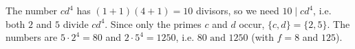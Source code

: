 The number $cd^4$ has $(1+1)(4+1)=10$ divisors, so we need $10\mid cd^4$, i.e. both $2$ and $5$ divide $cd^4$. Since only the primes $c$ and $d$ occur, $\{c,d\}=\{2,5\}$. The numbers are $5\cdot2^4=80$ and $2\cdot5^4=1250$, i.e. $\boxed{80\text{ and }1250}$ (with $f=8$ and $125$).
